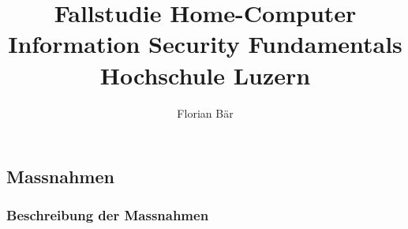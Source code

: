 \documentclass{article}
\begin{document}
\title{%
	Fallstudie Home-Computer \\
	\large Information Security Fundamentals \\
	Hochschule Luzern}

\author{Florian Bär}
\maketitle
\thispagestyle{empty}
\clearpage
\setcounter{page}{1}

\tableofcontents



\newpage




\begin{landscape}





\subsection{Massnahmen}

\subsubsection{Beschreibung der Massnahmen}


\end{landscape}
\end{document}
